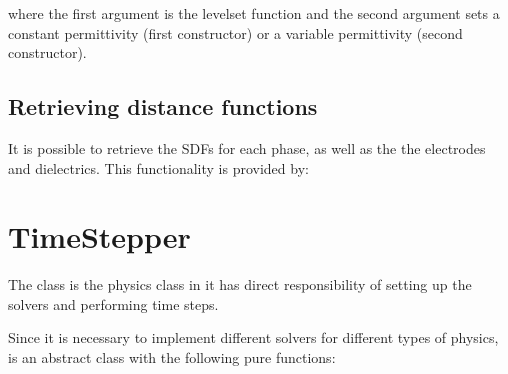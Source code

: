 \documentclass[letterpaper,10pt,english]{sphinxmanual}
\begin{document}
\sphinxAtStartPar
where the first argument is the level\sphinxhyphen{}set function and the second argument sets a constant permittivity (first constructor) or a variable permittivity (second constructor).


\subsection{Retrieving distance functions}
\label{\detokenize{Source/ComputationalGeometry:retrieving-distance-functions}}
\sphinxAtStartPar
It is possible to retrieve the SDFs for each phase, as well as the the electrodes and dielectrics.
This functionality is provided by:

\begin{sphinxVerbatim}[commandchars=\\\{\},formatcom=\scriptsize]
   
   

   
   
\end{sphinxVerbatim}

\sphinxstepscope


\section{TimeStepper}
\label{\detokenize{Source/TimeStepper:timestepper}}\label{\detokenize{Source/TimeStepper:chap-timestepper}}\label{\detokenize{Source/TimeStepper::doc}}
\sphinxAtStartPar
The  class is the physics class in  \sphinxhyphen{} it has direct responsibility of setting up the solvers and performing time steps.

\sphinxAtStartPar
Since it is necessary to implement different solvers for different types of physics,  is an abstract class with the following pure functions:
\end{document}
